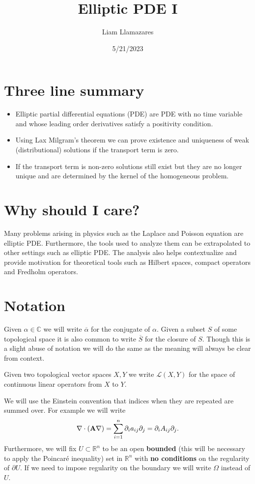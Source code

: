 \documentclass[
    a4paper,
    DIV=14,
    abstract=true,
    numbers=noenddot
]
{scrartcl}
\theoremstyle{definition}
\newcommand{\C}{\mathbb{C}}
\newcommand{\R}{\mathbb{R}}
\newcommand{\Ll}{\mathcal{L}}
\begin{document}
\title{Elliptic PDE I}
\author{Liam Llamazares}
\date{5/21/2023}
\maketitle
\section{ Three line summary}
\begin{itemize}
    \item Elliptic partial differential equations (PDE) are PDE with no time variable and whose leading order derivatives satisfy a positivity condition.
    \item Using Lax Milgram's theorem we can prove existence and uniqueness of weak (distributional) solutions if the transport term is zero.
    \item If the transport term is non-zero solutions still exist but they are no longer unique and are determined by the kernel of the homogeneous problem.\end{itemize}
\section{Why should I care?}
Many problems arising in physics such as the Laplace and Poisson equation are elliptic PDE. Furthermore, the tools used to analyze them can be extrapolated to other settings such as
elliptic PDE. The analysis also helps contextualize and provide motivation for theoretical tools such as Hilbert spaces, compact operators and Fredholm operators.
\section{Notation}
Given $\alpha \in \C$ we will write $\overline{\alpha }$ for the conjugate of $\alpha $. Given a subset $S$ of some topological space it is also common to write  $\overline{S}$ for the closure of $S$. Though this is a slight abuse of notation we will do the same as the meaning will always be clear from context.

Given two topological vector spaces $X,Y$ we write  $\Ll(X,Y)$ for the space of continuous linear operators from $X$ to  $Y$.

We will use the Einstein convention that indices when they are repeated are summed over. For example we will write
\begin{align*}
    \nabla \cdot (\vb{A}\nabla)=\sum_{i=1}^n \partial_i a_{ij} \partial _j =\partial_i A_{ij} \partial _j.
\end{align*}
Furthermore, we will fix $U \subset \R^n$ to be an open \textbf{bounded} (this will be necessary to apply the Poincaré inequality) set in $\R^n$ with \textbf{no conditions} on the regularity of $\partial U$. If we need to impose regularity on the boundary we will write $\Omega$ instead of $U$.
\end{document}
